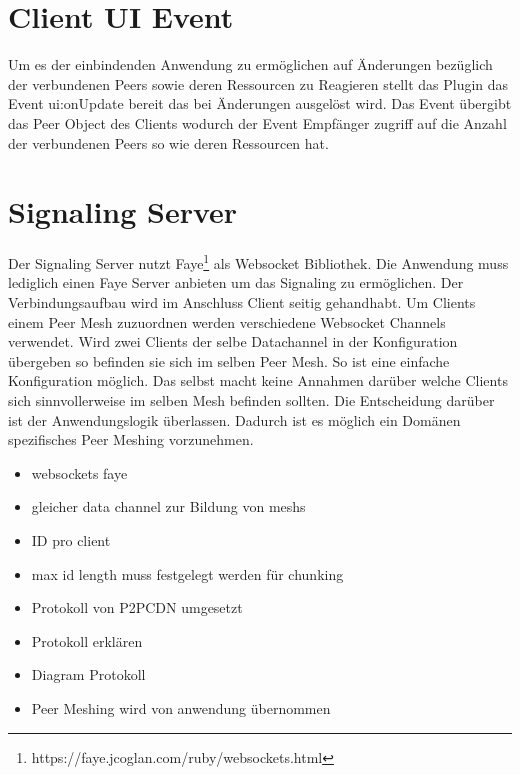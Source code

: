 \section{Client UI Event}
Um es der einbindenden Anwendung zu ermöglichen auf Änderungen bezüglich der verbundenen Peers sowie deren Ressourcen zu Reagieren stellt das Plugin das Event ui:onUpdate bereit das bei Änderungen ausgelöst wird. Das Event übergibt das Peer Object des Clients wodurch der Event Empfänger zugriff auf die Anzahl der verbundenen Peers so wie deren Ressourcen hat. 

\section{Signaling Server}
Der Signaling Server nutzt Faye\footnote{https://faye.jcoglan.com/ruby/websockets.html} als Websocket Bibliothek. Die Anwendung muss lediglich einen Faye Server anbieten um das Signaling zu ermöglichen. Der Verbindungsaufbau wird im Anschluss Client seitig gehandhabt. 
Um Clients einem Peer Mesh zuzuordnen werden verschiedene Websocket Channels verwendet. Wird zwei Clients der selbe Datachannel in der Konfiguration übergeben so befinden sie sich im selben Peer Mesh. So ist eine einfache Konfiguration möglich. Das \cdn selbst macht keine Annahmen darüber welche Clients sich sinnvollerweise im selben Mesh befinden sollten. Die Entscheidung darüber ist der Anwendungslogik überlassen. Dadurch ist es möglich ein Domänen spezifisches Peer Meshing vorzunehmen.

\begin{itemize}
  \item websockets faye
  \item gleicher data channel zur Bildung von meshs
  \item ID pro client
  \item max id length muss festgelegt werden für chunking
  \item Protokoll von P2PCDN umgesetzt
  \item Protokoll erklären
  \item Diagram Protokoll
  \item Peer Meshing wird von anwendung übernommen
\end{itemize}

